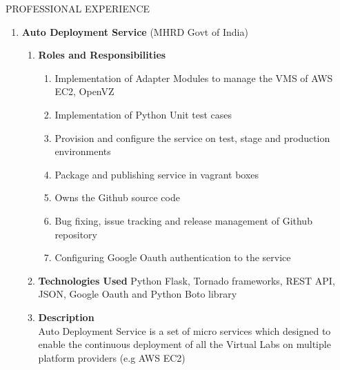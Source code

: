 \documentclass{resume} %
\newcommand{\blank}[1]{\hspace*{#1}}
\begin{document}
\begin{rSection}{PROFESSIONAL EXPERIENCE}
\begin{rSubsection}
\begin{enumerate}[label=\bfseries\arabic*]
\item \textbf {Auto Deployment Service} (MHRD Govt of India)
  \begin{enumerate}
    
  \item \textbf{Roles and Responsibilities}
    \begin{enumerate}
    \item Implementation of Adapter Modules to manage the VMS of AWS
      EC2, OpenVZ
    \item Implementation of Python Unit test cases
    \item Provision and configure the service on test, stage and
      production environments
    \item Package and publishing service in vagrant boxes
    \item Owns the Github source code
    \item Bug fixing, issue tracking and release management of Github
      repository
    \item Configuring Google Oauth authentication to the service
    \end{enumerate}
    
  \item \textbf{Technologies Used } Python Flask, Tornado
    frameworks, REST API, JSON, Google Oauth and Python Boto
    library
  \item \textbf{Description } \\
    \blank{2 cm}Auto Deployment Service is a set of micro services which designed to enable
    the continuous deployment of all the Virtual Labs on multiple platform
    providers (e.g AWS EC2)
  \end{enumerate}


\end{enumerate}
\end{rSubsection}
\end{rSection}
\end{document}
